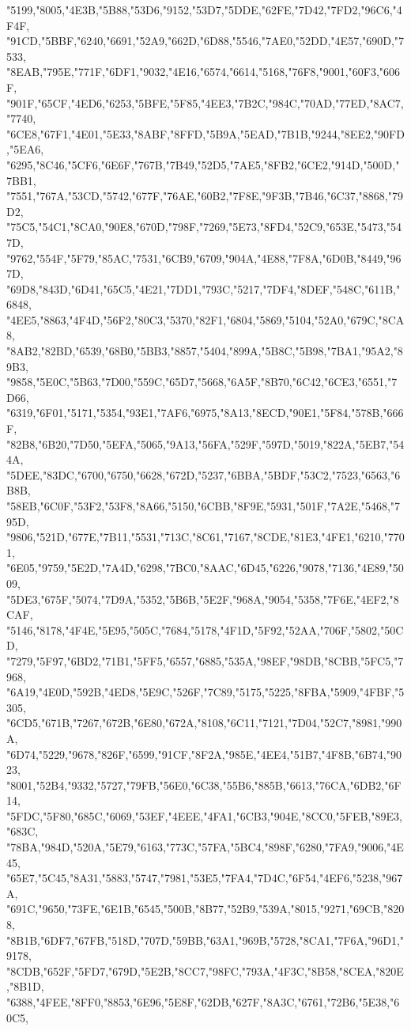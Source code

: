 \documentclass{ltjsarticle}
\begin{document}
{  "5199,"8005,"4E3B,"5B88,"53D6,"9152,"53D7,"5DDE,"62FE,"7D42,"7FD2,"96C6,"4F4F,
  "91CD,"5BBF,"6240,"6691,"52A9,"662D,"6D88,"5546,"7AE0,"52DD,"4E57,"690D,"7533,
  "8EAB,"795E,"771F,"6DF1,"9032,"4E16,"6574,"6614,"5168,"76F8,"9001,"60F3,"606F,
  "901F,"65CF,"4ED6,"6253,"5BFE,"5F85,"4EE3,"7B2C,"984C,"70AD,"77ED,"8AC7,"7740,
  "6CE8,"67F1,"4E01,"5E33,"8ABF,"8FFD,"5B9A,"5EAD,"7B1B,"9244,"8EE2,"90FD,"5EA6,
  "6295,"8C46,"5CF6,"6E6F,"767B,"7B49,"52D5,"7AE5,"8FB2,"6CE2,"914D,"500D,"7BB1,
  "7551,"767A,"53CD,"5742,"677F,"76AE,"60B2,"7F8E,"9F3B,"7B46,"6C37,"8868,"79D2,
  "75C5,"54C1,"8CA0,"90E8,"670D,"798F,"7269,"5E73,"8FD4,"52C9,"653E,"5473,"547D,
  "9762,"554F,"5F79,"85AC,"7531,"6CB9,"6709,"904A,"4E88,"7F8A,"6D0B,"8449,"967D,
  "69D8,"843D,"6D41,"65C5,"4E21,"7DD1,"793C,"5217,"7DF4,"8DEF,"548C,"611B,"6848,
  "4EE5,"8863,"4F4D,"56F2,"80C3,"5370,"82F1,"6804,"5869,"5104,"52A0,"679C,"8CA8,
  "8AB2,"82BD,"6539,"68B0,"5BB3,"8857,"5404,"899A,"5B8C,"5B98,"7BA1,"95A2,"89B3,
  "9858,"5E0C,"5B63,"7D00,"559C,"65D7,"5668,"6A5F,"8B70,"6C42,"6CE3,"6551,"7D66,
  "6319,"6F01,"5171,"5354,"93E1,"7AF6,"6975,"8A13,"8ECD,"90E1,"5F84,"578B,"666F,
  "82B8,"6B20,"7D50,"5EFA,"5065,"9A13,"56FA,"529F,"597D,"5019,"822A,"5EB7,"544A,
  "5DEE,"83DC,"6700,"6750,"6628,"672D,"5237,"6BBA,"5BDF,"53C2,"7523,"6563,"6B8B,
  "58EB,"6C0F,"53F2,"53F8,"8A66,"5150,"6CBB,"8F9E,"5931,"501F,"7A2E,"5468,"795D,
  "9806,"521D,"677E,"7B11,"5531,"713C,"8C61,"7167,"8CDE,"81E3,"4FE1,"6210,"7701,
  "6E05,"9759,"5E2D,"7A4D,"6298,"7BC0,"8AAC,"6D45,"6226,"9078,"7136,"4E89,"5009,
  "5DE3,"675F,"5074,"7D9A,"5352,"5B6B,"5E2F,"968A,"9054,"5358,"7F6E,"4EF2,"8CAF,
  "5146,"8178,"4F4E,"5E95,"505C,"7684,"5178,"4F1D,"5F92,"52AA,"706F,"5802,"50CD,
  "7279,"5F97,"6BD2,"71B1,"5FF5,"6557,"6885,"535A,"98EF,"98DB,"8CBB,"5FC5,"7968,
  "6A19,"4E0D,"592B,"4ED8,"5E9C,"526F,"7C89,"5175,"5225,"8FBA,"5909,"4FBF,"5305,
  "6CD5,"671B,"7267,"672B,"6E80,"672A,"8108,"6C11,"7121,"7D04,"52C7,"8981,"990A,
  "6D74,"5229,"9678,"826F,"6599,"91CF,"8F2A,"985E,"4EE4,"51B7,"4F8B,"6B74,"9023,
  "8001,"52B4,"9332,"5727,"79FB,"56E0,"6C38,"55B6,"885B,"6613,"76CA,"6DB2,"6F14,
  "5FDC,"5F80,"685C,"6069,"53EF,"4EEE,"4FA1,"6CB3,"904E,"8CC0,"5FEB,"89E3,"683C,
  "78BA,"984D,"520A,"5E79,"6163,"773C,"57FA,"5BC4,"898F,"6280,"7FA9,"9006,"4E45,
  "65E7,"5C45,"8A31,"5883,"5747,"7981,"53E5,"7FA4,"7D4C,"6F54,"4EF6,"5238,"967A,
  "691C,"9650,"73FE,"6E1B,"6545,"500B,"8B77,"52B9,"539A,"8015,"9271,"69CB,"8208,
  "8B1B,"6DF7,"67FB,"518D,"707D,"59BB,"63A1,"969B,"5728,"8CA1,"7F6A,"96D1,"9178,
  "8CDB,"652F,"5FD7,"679D,"5E2B,"8CC7,"98FC,"793A,"4F3C,"8B58,"8CEA,"820E,"8B1D,
  "6388,"4FEE,"8FF0,"8853,"6E96,"5E8F,"62DB,"627F,"8A3C,"6761,"72B6,"5E38,"60C5,
}
\end{document}
